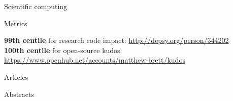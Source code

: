 \documentclass{cv}
\begin{document}
\begin{cvSection}{Scientific computing}

\begin{cvSubSection}{Metrics}

{\bf 99th centile} for research code impact: \url{http://depsy.org/person/344202} \\
{\bf 100th centile} for open-source kudos: \url{https://www.openhub.net/accounts/matthew-brett/kudos}

\end{cvSubSection}

\begin{cvSubSection}{Articles}

\printbibliography[heading=none,
    keyword=computing,
    keyword=article,
notkeyword=omit]

\end{cvSubSection}

\begin{cvSubSection}{Abstracts}

\printbibliography[heading=none,
    keyword=computing,
    keyword=abstract,
notkeyword=omit]

\end{cvSubSection}

\end{cvSection}
\end{document}
